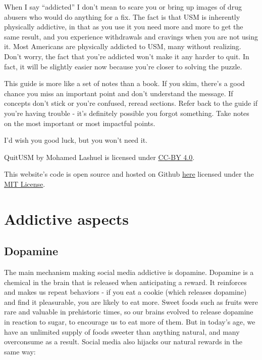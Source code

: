 \documentclass[
  openany]{book}
\begin{document}
When I say ``addicted'' I don't mean to scare you or bring up images of drug abusers who would do anything for a fix. The fact is that USM is inherently physically addictive, in that as you use it you need more and more to get the same result, and you experience withdrawals and cravings when you are not using it. Most Americans are physically addicted to USM, many without realizing. Don't worry, the fact that you're addicted won't make it any harder to quit. In fact, it will be slightly easier now because you're closer to solving the puzzle.

This guide is more like a set of notes than a book. If you skim, there's a good chance you miss an important point and don't understand the message. If concepts don't stick or you're confused, reread sections. Refer back to the guide if you're having trouble - it's definitely possible you forgot something. Take notes on the most important or most impactful points.

I'd wish you good luck, but you won't need it.

QuitUSM by Mohamed Lashuel is licensed under \href{ttps://creativecommons.org/licenses/by/4.0/}{CC-BY 4.0}.

This website's code is open source and hosted on Github \href{https://github.com/MohamedLashuel/QuitUSM/}{here} licensed under the \href{https://github.com/MohamedLashuel/QuitUSM/blob/main/LICENSE}{MIT License}.

\chapter{Addictive aspects}\label{why-addictive}

\section{Dopamine}\label{dopamine}

The main mechanism making social media addictive is dopamine. Dopamine is a chemical in the brain that is released when anticipating a reward. It reinforces and makes us repeat behaviors - if you eat a cookie (which releases dopamine) and find it pleasurable, you are likely to eat more. Sweet foods such as fruits were rare and valuable in prehistoric times, so our brains evolved to release dopamine in reaction to sugar, to encourage us to eat more of them. But in today's age, we have an unlimited supply of foods sweeter than anything natural, and many overconsume as a result. Social media also hijacks our natural rewards in the same way:
\end{document}
